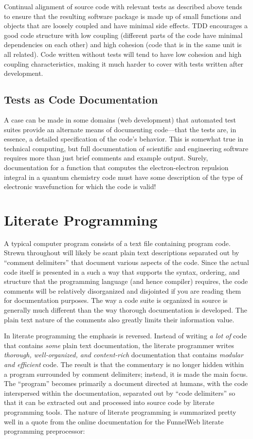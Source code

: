 Continual alignment of source code with relevant tests as described above tends to ensure that the resulting 
software package is made up of small functions and objects that are loosely coupled and have minimal side effects.
TDD encourages a good code structure with low coupling (different parts of the code have minimal dependencies
on each other) and high cohesion (code that is in the same unit is all related). Code written without tests will
tend to have low cohesion and high coupling characteristics, making it much harder to cover with tests
written after development.

\subsection{Tests as Code Documentation}
A case can be made in some domains (\eg web development) that automated test suites 
provide an alternate means of documenting code---that
the tests are, in essence, a detailed specification of the code's behavior. This is somewhat true in
technical computing, but full documentation of scientific and engineering software requires 
more than just brief comments and example output. Surely, documentation for a function that computes 
the electron-electron repulsion integral in a quantum chemistry code must have some description
of the type of electronic wavefunction for which the code is valid! 

\section{Literate Programming}

A typical computer program consists of a text file 
containing program code. Strewn throughout will likely be scant plain text descriptions separated out by 
``comment delimiters'' that document various aspects of the code.
Since the actual code itself is presented in a such a way that supports the syntax, ordering, and structure 
that the programming language (and hence compiler) requires, the code comments will
be relatively disorganized and disjointed if you are reading them for documentation purposes. 
The way a code suite is organized in source is generally much different than the way thorough documentation is 
developed. The plain text nature of the comments also greatly limits their information value.

In literate programming the emphasis is reversed. Instead of writing \textit{a lot of} code that contains 
\textit{some} plain text documentation, 
the literate programmer writes \textit{thorough, well-organized, and content-rich} documentation that contains 
\textit{modular and efficient} code. 
The result is that the commentary is no longer hidden within a program surrounded by 
comment delimiters; instead, it is made the main focus. 
The ``program'' becomes primarily a document directed at humans, with the 
code interspersed within the documentation, separated out by ``code delimiters'' so that it can be extracted 
out and processed into source code by literate programming tools. The nature of literate programming is 
summarized pretty well in a quote from the online documentation for the FunnelWeb literate programming
preprocessor:

